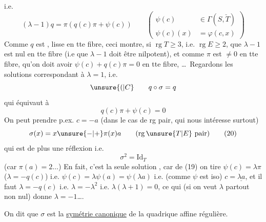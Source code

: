 i.e.
\[
(\lambda-1)q=\pi(q(c)\pi+\psi(c))\qquad
\left(\begin{aligned}\psi(c)&\in\Gamma(S,\check T)\\\psi(c)(x)&=\varphi(c,x)\end{aligned}\right)
\]
Comme $q$ est , lisse en tte fibre, ceci montre, si $\operatorname{rg}T\geq3$, i.e. $\operatorname{rg}E\geq2$, que $\lambda-1$ est nul en tte fibre (i.e que $\lambda-1$ doit être nilpotent),  et  comme $\pi$ est $\ne0$ en tte fibre, qu'on doit avoir $\psi(c)+q(c)\pi=0$ en tte fibre, \ldots\ Regardons les solutions correspondant à $\lambda=1$, i.e.
\[
\unsure{(|C}\qquad q\circ\sigma=q
\]
qui équivaut à
\[
q(c)\pi+\psi(c)=0\tag*{(19)}
\]
 On peut prendre p.ex. $c=-a$ (dans le cas  de rg pair, qui nous intéresse surtout)
\[
\sigma(x)=x\unsure{-|+}\pi(x)a\qquad(\operatorname{rg}\unsure{T|E}\ \text{pair})\tag*{(20)}
\]
qui est de plus une réflexion i.e.
\[
\sigma^2=\mathrm{Id}_T\tag*{(21)}
\]
(car  $\pi(a)=2\ldots$) En fait, c'est la seule solution ,  car de (19) on tire $\psi(c)=\lambda\pi$ ($\lambda=-q(c)$)  i.e. $\psi(c)=\lambda\psi(a)=\psi(\lambda a)$ i.e. (comme $\psi$ est iso) $c=\underline{\lambda a}$, et il faut $\lambda=-q(c)$ i.e. $\lambda=-\lambda^2$ i.e. $\lambda(\lambda+1)=0$, ce qui (si on veut $\lambda$ partout non nul) donne $\lambda=-1$\ldots.

On dit que $\sigma$ est la \uline{symétrie canonique} de la quadrique affine régulière.
